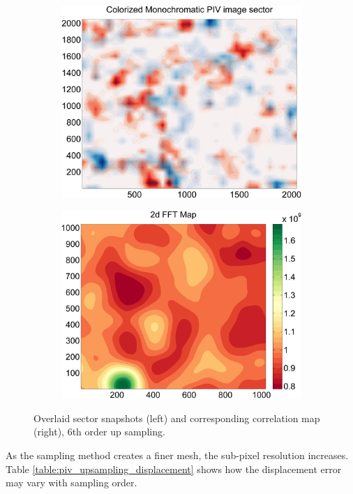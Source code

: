 \begin{figure}[H]
	\begin{subfigure}{.5\textwidth}
		\centering
		\includegraphics[width=.8\linewidth]{figs/piv_method/pive-fig_order6}
	\end{subfigure} 
	\begin{subfigure}{.5\textwidth}
		\centering
		\includegraphics[width=.8\linewidth]{figs/piv_method/pive_fft_order6}
	\end{subfigure}	
	\caption{Overlaid sector snapshots (left) and corresponding correlation 
		map (right), 6th order up sampling.}
	\label{fig:piv_sector_overlay_fft_6up}
\end{figure}

As the sampling method creates a finer mesh, the sub-pixel resolution 
increases. Table \ref{table:piv_upsampling_displacement} shows how the 
displacement error may vary with sampling order.




